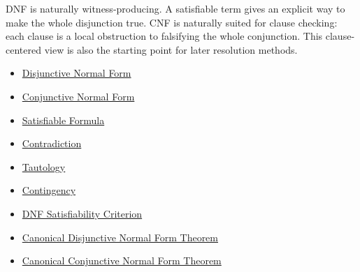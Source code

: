 \begin{remark*}[Exposition]
DNF is naturally witness-producing. A satisfiable term gives an explicit way
to make the whole disjunction true. CNF is naturally suited for clause
checking: each clause is a local obstruction to falsifying the whole
conjunction. This clause-centered view is also the starting point for later
resolution methods.
\end{remark*}

\begin{dependencies}
\begin{itemize}
  \item \hyperref[def:disjunctive-normal-form-propositional-logic]{Disjunctive Normal Form}
  \item \hyperref[def:conjunctive-normal-form-propositional-logic]{Conjunctive Normal Form}
  \item \hyperref[def:satisfiable-formula-propositional-logic]{Satisfiable Formula}
  \item \hyperref[def:contradiction-propositional-logic]{Contradiction}
  \item \hyperref[def:tautology-propositional-logic]{Tautology}
  \item \hyperref[def:contingency-propositional-logic]{Contingency}
  \item \hyperref[thm:dnf-satisfiability-criterion-propositional-logic]{DNF Satisfiability Criterion}
  \item \hyperref[thm:canonical-disjunctive-normal-form-propositional-logic]{Canonical Disjunctive Normal Form Theorem}
  \item \hyperref[thm:canonical-conjunctive-normal-form-propositional-logic]{Canonical Conjunctive Normal Form Theorem}
\end{itemize}
\end{dependencies}
